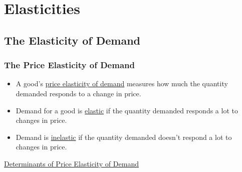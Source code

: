 \chapter{Elasticities}

\section{The Elasticity of Demand}



\subsection{The Price Elasticity of Demand}

\begin{itemize}

	\item A good's \underline{price elasticity of demand} measures how much the quantity demanded responds to a change in price.
	
	\item Demand for a good is \underline{elastic} if the quantity demanded responds a lot to changes in price.
	
	\item Demand is \underline{inelastic} if the quantity demanded doesn't respond a lot to changes in price. 

\end{itemize}

\underline{Determinants of Price Elasticity of Demand}

